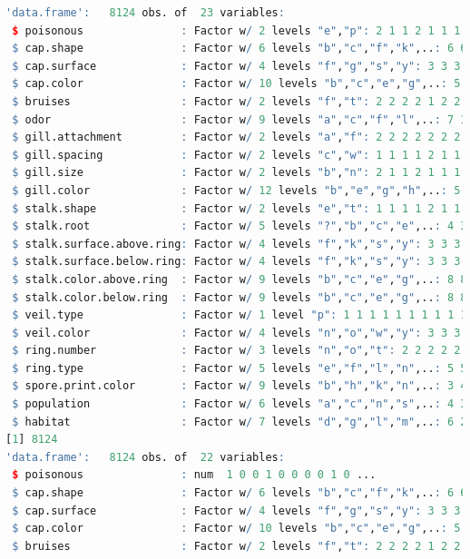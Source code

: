 \documentclass[12pt]{article}
\begin{document}
\begin{lstlisting}[language = R]
    'data.frame':	8124 obs. of  23 variables:
 $ poisonous               : Factor w/ 2 levels "e","p": 2 1 1 2 1 1 1 1 2 1 ...
 $ cap.shape               : Factor w/ 6 levels "b","c","f","k",..: 6 6 1 6 6 6 1 1 6 1 ...
 $ cap.surface             : Factor w/ 4 levels "f","g","s","y": 3 3 3 4 3 4 3 4 4 3 ...
 $ cap.color               : Factor w/ 10 levels "b","c","e","g",..: 5 10 9 9 4 10 9 9 9 10 ...
 $ bruises                 : Factor w/ 2 levels "f","t": 2 2 2 2 1 2 2 2 2 2 ...
 $ odor                    : Factor w/ 9 levels "a","c","f","l",..: 7 1 4 7 6 1 1 4 7 1 ...
 $ gill.attachment         : Factor w/ 2 levels "a","f": 2 2 2 2 2 2 2 2 2 2 ...
 $ gill.spacing            : Factor w/ 2 levels "c","w": 1 1 1 1 2 1 1 1 1 1 ...
 $ gill.size               : Factor w/ 2 levels "b","n": 2 1 1 2 1 1 1 1 2 1 ...
 $ gill.color              : Factor w/ 12 levels "b","e","g","h",..: 5 5 6 6 5 6 3 6 8 3 ...
 $ stalk.shape             : Factor w/ 2 levels "e","t": 1 1 1 1 2 1 1 1 1 1 ...
 $ stalk.root              : Factor w/ 5 levels "?","b","c","e",..: 4 3 3 4 4 3 3 3 4 3 ...
 $ stalk.surface.above.ring: Factor w/ 4 levels "f","k","s","y": 3 3 3 3 3 3 3 3 3 3 ...
 $ stalk.surface.below.ring: Factor w/ 4 levels "f","k","s","y": 3 3 3 3 3 3 3 3 3 3 ...
 $ stalk.color.above.ring  : Factor w/ 9 levels "b","c","e","g",..: 8 8 8 8 8 8 8 8 8 8 ...
 $ stalk.color.below.ring  : Factor w/ 9 levels "b","c","e","g",..: 8 8 8 8 8 8 8 8 8 8 ...
 $ veil.type               : Factor w/ 1 level "p": 1 1 1 1 1 1 1 1 1 1 ...
 $ veil.color              : Factor w/ 4 levels "n","o","w","y": 3 3 3 3 3 3 3 3 3 3 ...
 $ ring.number             : Factor w/ 3 levels "n","o","t": 2 2 2 2 2 2 2 2 2 2 ...
 $ ring.type               : Factor w/ 5 levels "e","f","l","n",..: 5 5 5 5 1 5 5 5 5 5 ...
 $ spore.print.color       : Factor w/ 9 levels "b","h","k","n",..: 3 4 4 3 4 3 3 4 3 3 ...
 $ population              : Factor w/ 6 levels "a","c","n","s",..: 4 3 3 4 1 3 3 4 5 4 ...
 $ habitat                 : Factor w/ 7 levels "d","g","l","m",..: 6 2 4 6 2 2 4 4 2 4 ...
[1] 8124
'data.frame':	8124 obs. of  22 variables:
 $ poisonous               : num  1 0 0 1 0 0 0 0 1 0 ...
 $ cap.shape               : Factor w/ 6 levels "b","c","f","k",..: 6 6 1 6 6 6 1 1 6 1 ...
 $ cap.surface             : Factor w/ 4 levels "f","g","s","y": 3 3 3 4 3 4 3 4 4 3 ...
 $ cap.color               : Factor w/ 10 levels "b","c","e","g",..: 5 10 9 9 4 10 9 9 9 10 ...
 $ bruises                 : Factor w/ 2 levels "f","t": 2 2 2 2 1 2 2 2 2 2 ...

\end{lstlisting}
\end{document}
